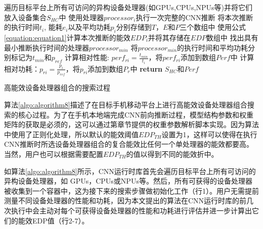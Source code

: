 \begin{algorithm}[htbp]
  \small
  \SetAlgoLined
    \begin{spacing}{0.8}
    遍历目标平台上所有可访问的异构设备处理器(如GPUs,CPUs,NPUs等)并将它们放入设备集合$S_{HC}$中\;
     {
        使用处理器$processor_i$执行一次完整的CNN推断\;
        将本次推断的执行时间$t_i$, 能耗$e_i$以及平均功耗$p_i$分别存储到$T$，$E$和$P$三个数组中\;
        使用公式\ref{equation:equation1}计算本次推断的能效$EDP_i$并将其存储在$EDP$数组中\;
    }
    找出具有最小推断执行时间的处理器$processor_{min}$\;
    将$processor_{min}$的执行时间和平均功耗分别标记为$t_{min}$和$p_{ref}$\;
     {
    计算相对性能: $perf_{ri} = \frac{t_{min}}{t_i}$，将$perf_{ri}$添加到数组$Perf$中\;
    计算相对功耗：$p_{ri} = \frac{p_{i}}{p_{ref}}$，将$p_{ri}$添加到数组$P_r$中\;
    }
    \textbf{return} $S_{HC}$和$Perf$\;
   \end{spacing}
  \caption{高能效设备处理器组合的搜索过程}
  \label{algo:algorithm8}
\end{algorithm}

算法\ref{algo:algorithm8}描述了在目标手机移动平台上进行高能效设备处理器组合搜索的核心过程。为了在手机本地端完成CNN前向推断过程，模型结构参数和权重矩阵的获取是必须的，这可以通过第\label{chapter:chapter3-2-1}章节提供的权重参数解析脚本实现。因为算法中使用了正则化处理，所以默认的能效阈值$EDP_{TH}$设置为1，这样可以使得在执行CNN推断时所选设备处理器组合的复合能效比任何一个单处理器的能效都要高。当然，用户也可以根据需要配置$EDP_{TH}$的值以得到不同的能效折中。

如算法\ref{algo:algorithm8}所示，CNN运行时库首先会遍历目标平台上所有可访问的异构设备处理器，如 GPUs，CPUs或NPUs等。然后，所有可获得的设备处理器被收集到一个容器中，这为接下来的搜索步骤做初始化工作（行1）。用户无需提前测量不同设备处理器的性能和功耗，因为本文提出的算法在CNN运行时库的前几次执行中会主动对每个可获得设备处理器的性能和功耗进行评估并进一步计算出它们的能效EDP值（行2-7）。

